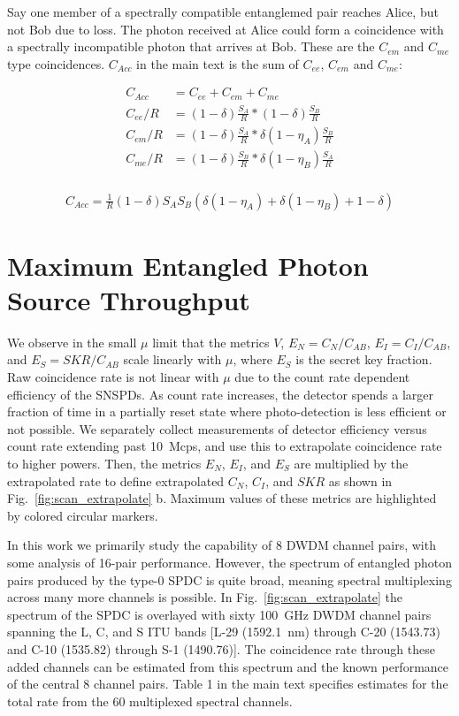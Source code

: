 \documentclass[11pt]{caltech_thesis} %
\begin{document}
Say one member of a spectrally compatible entanglemed pair reaches Alice, but not Bob due to loss. The photon received at Alice could form a coincidence with a spectrally incompatible photon that arrives at Bob. These are the $C_{em}$ and $C_{me}$ type coincidences. $C_{Acc}$ in the main text is the sum of $C_{ee}$, $C_{em}$ and $C_{me}$:

\begin{align}
    C_{Acc} &= C_{ee} + C_{em} + C_{me} \\
    C_{ee}/R &= (1 - \delta)\frac{S_A}{R} * (1 - \delta)\frac{S_B}{R} \\
    C_{em}/R &= (1 - \delta)\frac{S_A}{R} * \delta (1-\eta_A) \frac{S_B}{R} \\
    C_{me}/R &= (1 - \delta)\frac{S_B}{R} * \delta (1-\eta_B) \frac{S_A}{R} \\
\end{align}

\begin{align}
C_{Acc} = \frac{1}{R}(1 - \delta) S_A S_B \left(\delta \left(1-\eta _A\right)+\delta \left(1-\eta _B\right)+1-\delta\right)
\end{align}

\hypertarget{maximum-entangled-photon-source-throughput}{%
\section{Maximum Entangled Photon Source Throughput}\label{maximum-entangled-photon-source-throughput}}

We observe in the small $\mu$ limit that the metrics $V$, $E_N = C_N/C_{AB}$, $E_I = C_I/C_{AB}$, and $E_S = SKR/C_{AB}$ scale linearly with $\mu$, where $E_S$ is the secret key fraction. Raw coincidence rate is not linear with $\mu$ due to the count rate dependent efficiency of the SNSPDs. As count rate increases, the detector spends a larger fraction of time in a partially reset state where photo-detection is less efficient or not possible. We separately collect measurements of detector efficiency versus count rate extending past 10~Mcps, and use this to extrapolate coincidence rate to higher powers. Then, the metrics $E_N$, $E_I$, and $E_S$ are multiplied by the extrapolated rate to define extrapolated $C_N$, $C_I$, and $SKR$ as shown in Fig.~\ref{fig:scan_extrapolate} b. Maximum values of these metrics are highlighted by colored circular markers.

In this work we primarily study the capability of 8 DWDM channel pairs, with some analysis of 16-pair performance. However, the spectrum of entangled photon pairs produced by the type-0 SPDC is quite broad, meaning spectral multiplexing across many more channels is possible. In Fig.~\ref{fig:scan_extrapolate} the spectrum of the SPDC is overlayed with sixty 100~GHz DWDM channel pairs spanning the L, C, and S ITU bands {[}L-29 (1592.1~nm) through C-20 (1543.73) and C-10 (1535.82) through S-1 (1490.76){]}. The coincidence rate through these added channels can be estimated from this spectrum and the known performance of the central 8 channel pairs. Table 1 in the main text specifies estimates for the total rate from the 60 multiplexed spectral channels.
\end{document}
